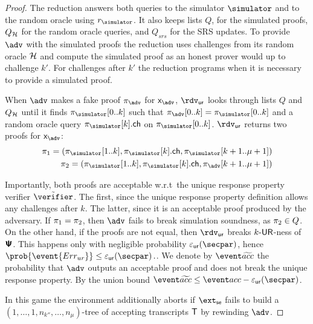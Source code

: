 \begin{proof}
	The reduction answers both queries to the simulator $\simulator$ and to the random oracle using $\rsim$. It also keeps lists $Q$, for the simulated proofs, $Q_{\mathcal{H}}$ for the random oracle queries, and $Q_{srs}$ for the SRS updates. To provide $\adv$ with the simulated proofs the reduction uses challenges from its random oracle $\mathcal{H}$ and compute the simulated proof as an honest prover would up to challenge $k'$. For challenges after $k'$ the reduction programs when it is necessary to provide a simulated proof.

	When $\adv$ makes a fake proof $\zkproof_{\adv}$ for $\inp_{\adv}$, $\rdvur$
		looks through lists $Q$ and $Q_{\mathcal{H}}$ until it finds $\zkproof_{\simulator}[0..k]$
		such that $\zkproof_{\adv}[0..k] = \zkproof_{\simulator}[0..k]$ and a random
		oracle query $\zkproof_{\simulator}[k].\ch$ on $\zkproof_{\simulator}[0..k]$.
	$\rdvur$ returns two proofs for $\inp_{\adv}$:
		\begin{align*}
		\zkproof_1 = (\zkproof_{\simulator}[1..k],
		\zkproof_{\simulator}[k].\ch, \zkproof_{\simulator}[k + 1..\mu + 1])\\
		\zkproof_2 = (\zkproof_{\simulator}[1..k],
		\zkproof_{\simulator}[k].\ch, \zkproof_{\adv}[k + 1..\mu + 1])
		\end{align*}

	Importantly, both proofs are acceptable w.r.t~the unique response property verifier $\tilde{\verifier}$. The first, since the unique response property definition allows any challenges after $k$. The latter, since it is an acceptable proof produced by the adversary.
	If $\pi_1 = \pi_2$, then $\adv$ fails to break simulation soundness, as
	$\pi_2 \in Q$. On the other hand, if the proofs are not equal, then $\rdvur$
	breaks ${k\text{-}\mathsf{UR}}$-ness of $\bm{\mathsf{\Psi}}$. This happens only with negligible probability
	$\epsur(\secpar)$, hence \( \prob{\event{\errur}} \leq \epsur(\secpar)\,. \). We denote by $\waccProb$ the probability that $\adv$ outputs an acceptable proof and does not break the unique response property. By the union bound $\waccProb \leq \accProb - \epsur (\secpar)$.

	\iffalse
	 In this game the environment additionally aborts if $\extse$ fails to build a
	$(1, \ldots, 1, n_{k''}, \ldots, n_\mu)$-tree of accepting transcripts $\mathsf{T}$ by rewinding
	$\adv$.
	

\end{proof}
